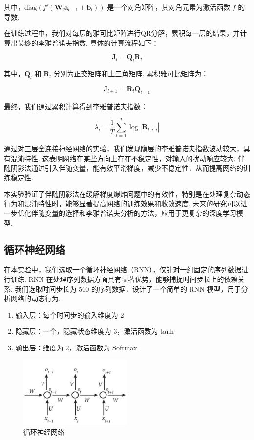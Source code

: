 其中，\(\text{diag}(f'(\mathbf{W}_l \mathbf{a}_{l-1} + \mathbf{b}_l))\) 是一个对角矩阵，其对角元素为激活函数 \(f\) 的导数. 

在训练过程中，我们对每层的雅可比矩阵进行QR分解，累积每一层的结果，并计算出最终的李雅普诺夫指数. 具体的计算流程如下：

\[
\mathbf{J}_l = \mathbf{Q}_l \mathbf{R}_l
\]

其中，\(\mathbf{Q}_l\) 和 \(\mathbf{R}_l\) 分别为正交矩阵和上三角矩阵. 累积雅可比矩阵为：

\[
\mathbf{J}_{l+1} = \mathbf{R}_l \mathbf{Q}_{l+1}
\]

最终，我们通过累积计算得到李雅普诺夫指数：

\[
\lambda_i = \frac{1}{T} \sum_{t=1}^T \log |\mathbf{R}_{t,i,i}|
\]

通过对三层全连接神经网络的实验，我们发现隐层的李雅普诺夫指数波动较大，具有混沌特性. 这表明网络在某些方向上存在不稳定性，对输入的扰动响应较大. 伴随阴影法通过引入伴随变量，能有效平滑梯度，减少不稳定性，从而提高网络的训练稳定性. 

本实验验证了伴随阴影法在缓解梯度爆炸问题中的有效性，特别是在处理复杂动态行为和混沌特性时，能够显著提高网络的训练效果和收敛速度. 未来的研究可以进一步优化伴随变量的选择和李雅普诺夫分析的方法，应用于更复杂的深度学习模型. 

\subsection{循环神经网络}

在本实验中，我们选取一个循环神经网络（RNN），仅针对一组固定的序列数据进行训练. RNN 在处理序列数据方面具有显著优势，能够捕捉时间步长上的依赖关系. 我们选取时间步长为 500 的序列数据，设计了一个简单的 RNN 模型，用于分析网络的动态行为. 

\begin{enumerate}
   \item 输入层：每个时间步的输入维度为 2
   \item 隐藏层：一个，隐藏状态维度为 3，激活函数为 tanh
   \item 输出层：维度为 2，激活函数为 Softmax
\end{enumerate}

\begin{figure}[htbp]
   \centering
   \includegraphics[width=0.5\textwidth]{figures/rnn.jpeg}
   \caption{循环神经网络}
   \label{fig:example}
 \end{figure}

